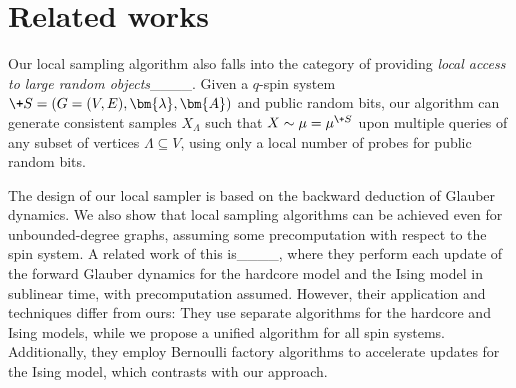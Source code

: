 \section{Related works}

Our local sampling algorithm also falls into the category of providing \emph{local access to large random objects}____.
Given a $q$-spin system $\+S = (G = (V, E), \bm{\lambda}, \bm{A})$ and public random bits, our algorithm can generate consistent samples $X_{\Lambda}$ such that $X \sim \mu = \mu^{\+S}$ upon multiple queries of any subset of vertices $\Lambda \subseteq V$, using only a local number of probes for public random bits.

The design of our local sampler is based on the backward deduction of Glauber dynamics. We also show that local sampling algorithms can be achieved even for unbounded-degree graphs, assuming some precomputation with respect to the spin system. A related work of this is____, where they perform each update of the forward Glauber dynamics for the hardcore model and the Ising model in sublinear time, with precomputation assumed. However, their application and techniques differ from ours: They use separate algorithms for the hardcore and Ising models, while we propose a unified algorithm for all spin systems. Additionally, they employ Bernoulli factory algorithms to accelerate updates for the Ising model, which contrasts with our approach.
